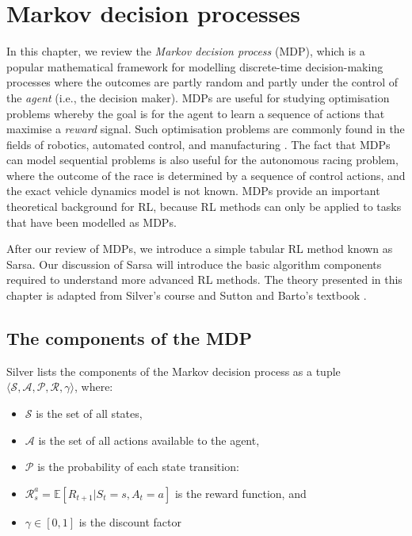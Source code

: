\chapter{Markov decision processes}
\label{chp:mdps}
In this chapter, we review the \emph{Markov decision process} (MDP), which is a popular mathematical framework for modelling discrete-time decision-making processes where the outcomes are partly random and partly under the control of the \emph{agent} (i.e., the decision maker).
MDPs are useful for studying optimisation problems whereby the goal is for the agent to learn a sequence of actions that maximise a \emph{reward} signal.
Such optimisation problems are commonly found in the fields of robotics, automated control, and manufacturing \cite{White1985}.
The fact that MDPs can model sequential problems is also useful for the autonomous racing problem, where the outcome of the race is determined by a sequence of control actions, and the exact vehicle dynamics model is not known.
MDPs provide an important theoretical background for RL, because RL methods can only be applied to tasks that have been modelled as MDPs.

After our review of MDPs, we introduce a simple tabular RL method known as Sarsa.
Our discussion of Sarsa will introduce the basic algorithm components required to understand more advanced RL methods.
The theory presented in this chapter is adapted from Silver's course \cite{silver2015} and Sutton and Barto's textbook \cite{sutton2020}.

\section{The components of the MDP}
\label{sec:agent_environment_interface}

Silver \cite{silver2015} lists the components of the Markov decision process as a tuple $\langle \mathcal{S,A,P,R}, \gamma \rangle$, where: 
\begin{itemize}
    \item $\mathcal{S}$ is the set of all states,
    \item $\mathcal{A}$ is the set of all actions available to the agent,
    \item $\mathcal{P}$ is the probability of each state transition:
    \item $\mathcal{R}_{s}^{a} = \mathbb{E} [R_{t+1} | S_t=s, A_t=a]$ is the reward function, and
    \item $\gamma \in [0,1]$ is the discount factor
\end{itemize}

